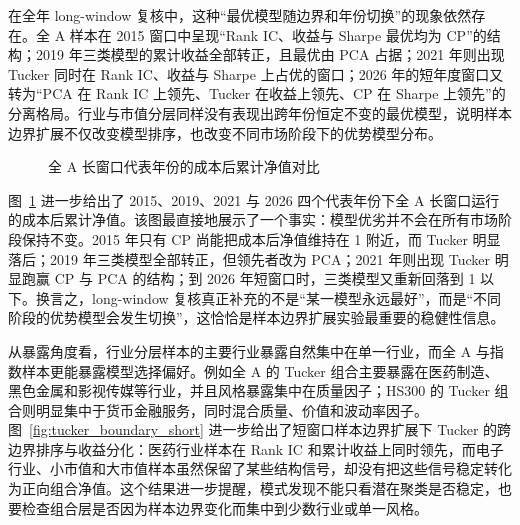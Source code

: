 在全年 long-window 复核中，这种“最优模型随边界和年份切换”的现象依然存在。全 A 样本在 2015 窗口中呈现“Rank IC、收益与 Sharpe 最优均为 CP”的结构；2019 年三类模型的累计收益全部转正，且最优由 PCA 占据；2021 年则出现 Tucker 同时在 Rank IC、收益与 Sharpe 上占优的窗口；2026 年的短年度窗口又转为“PCA 在 Rank IC 上领先、Tucker 在收益上领先、CP 在 Sharpe 上领先”的分离格局。行业与市值分层同样没有表现出跨年份恒定不变的最优模型，说明样本边界扩展不仅改变模型排序，也改变不同市场阶段下的优势模型分布。

\begin{figure}[!t]
\centering
{}
\caption{全 A 长窗口代表年份的成本后累计净值对比}
\label{fig:all_a_long_window_cost}
\end{figure}

图~\ref{fig:all_a_long_window_cost} 进一步给出了 2015、2019、2021 与 2026 四个代表年份下全 A 长窗口运行的成本后累计净值。该图最直接地展示了一个事实：模型优劣并不会在所有市场阶段保持不变。2015 年只有 CP 尚能把成本后净值维持在 1 附近，而 Tucker 明显落后；2019 年三类模型全部转正，但领先者改为 PCA；2021 年则出现 Tucker 明显跑赢 CP 与 PCA 的结构；到 2026 年短窗口时，三类模型又重新回落到 1 以下。换言之，long-window 复核真正补充的不是“某一模型永远最好”，而是“不同阶段的优势模型会发生切换”，这恰恰是样本边界扩展实验最重要的稳健性信息。

从暴露角度看，行业分层样本的主要行业暴露自然集中在单一行业，而全 A 与指数样本更能暴露模型选择偏好。例如全 A 的 Tucker 组合主要暴露在医药制造、黑色金属和影视传媒等行业，并且风格暴露集中在质量因子；HS300 的 Tucker 组合则明显集中于货币金融服务，同时混合质量、价值和波动率因子。图~\ref{fig:tucker_boundary_short} 进一步给出了短窗口样本边界扩展下 Tucker 的跨边界排序与收益分化：医药行业样本在 Rank IC 和累计收益上同时领先，而电子行业、小市值和大市值样本虽然保留了某些结构信号，却没有把这些信号稳定转化为正向组合净值。这个结果进一步提醒，模式发现不能只看潜在聚类是否稳定，也要检查组合层是否因为样本边界变化而集中到少数行业或单一风格。

